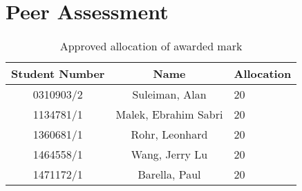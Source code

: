 \section{Peer Assessment}

\begin{table}[h]
\centering
\begin{tabular}{|c|c|l|}
	\hline
	\textbf{Student Number} & \textbf{Name} & \textbf{Allocation} \\ \hline
	0310903/2 & Suleiman, Alan & 20 \\ \hline
	1134781/1 & Malek, Ebrahim Sabri & 20 \\ \hline
	1360681/1 & Rohr, Leonhard & 20 \\ \hline
	1464558/1 & Wang, Jerry Lu & 20 \\ \hline
	1471172/1 & Barella, Paul &  20 \\ \hline
\end{tabular}
\caption{Approved allocation of awarded mark}
\end{table}
\clearpage
